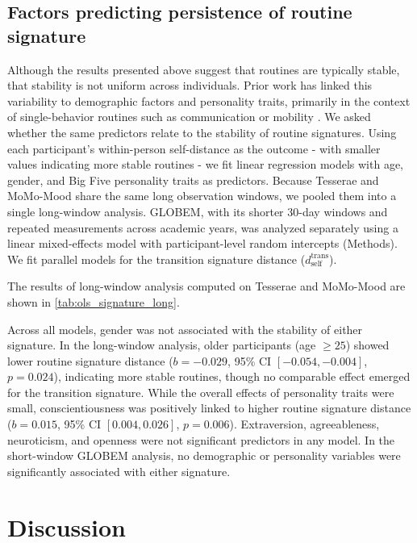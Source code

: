 \documentclass[pdflatex,sn-vancouver,Numbered]{bst/sn-jnl}%
\theoremstyle{thmstyleone}%
\theoremstyle{thmstyletwo}%
\theoremstyle{thmstylethree}%
\begin{document}
\subsection*{Factors predicting persistence of routine signature}\label{sec3.3}

Although the results presented above suggest that routines are typically stable, that stability is not uniform across individuals. Prior work has linked this variability to demographic factors and personality traits, primarily in the context of
single-behavior routines such as communication or mobility \cite{kulshrestha2021web, alessandrettiUnderstandingInterplaySocial2018, centellegherPersonalityTraitsEgonetwork2017}. We asked whether the same predictors relate to the stability of routine signatures. Using each participant's within-person self-distance as the outcome - with smaller values indicating more stable routines - we fit linear regression models with age, gender, and Big Five personality traits as predictors. Because Tesserae and MoMo-Mood share the same long observation windows, we pooled them into a single long-window analysis. GLOBEM, with its shorter 30-day windows and repeated measurements across academic years, was analyzed separately using a linear mixed-effects model with participant-level random intercepts (Methods). We fit parallel models for the transition signature distance ($d_{\text{self}}^{\text{trans}}$). 

The results of long-window analysis computed on Tesserae and MoMo-Mood are shown in \autoref{tab:ols_signature_long}.

Across all models, gender was not associated with the stability of either signature. In the long-window analysis, older participants (age $\geq 25$) showed lower routine signature distance ($b = -0.029$, 95\% CI $[-0.054, -0.004]$, $p = 0.024$), indicating more stable routines, though no comparable effect emerged for the transition signature. While the overall effects of personality traits were small, conscientiousness was positively linked to higher routine signature distance ($b = 0.015$, 95\% CI $[0.004, 0.026]$, $p = 0.006$). Extraversion, agreeableness, neuroticism, and openness were not significant predictors in any model. In the short-window GLOBEM analysis, no demographic or personality variables were significantly associated with either signature.

\section*{Discussion}\label{sec4}  
\end{document}
